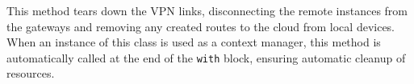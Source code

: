 \begin{description}[]
    \item[\texttt{VPNCloudMesh.tear_down(self)}]
    This method tears down the \gls{VPN} links, disconnecting the remote instances from the gateways and removing any created routes to the cloud from local devices.
    When an instance of this class is used as a context manager, this method is automatically called at the end of the \texttt{with} block, ensuring automatic cleanup of resources.
    
\end{description}
